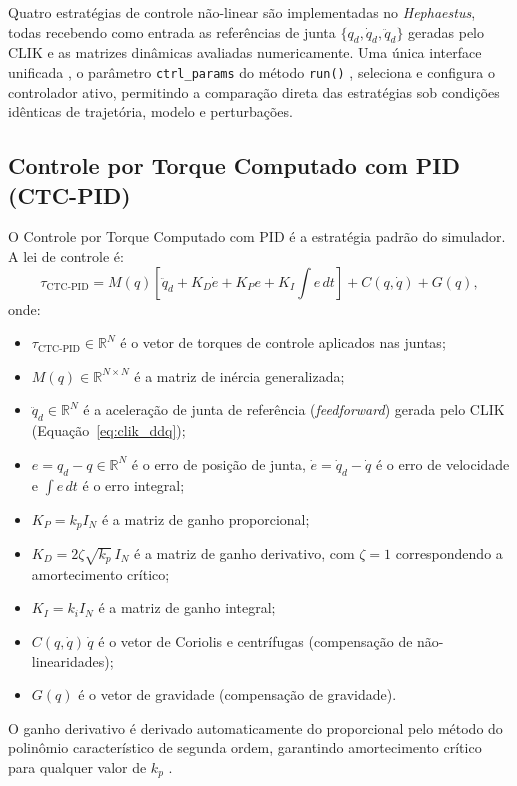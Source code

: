 Quatro estratégias de controle não-linear são implementadas no \textit{Hephaestus}, todas recebendo como entrada as referências de junta $\{q_d, \dot{q}_d, \ddot{q}_d\}$ geradas pelo CLIK e as matrizes dinâmicas avaliadas numericamente. Uma única interface unificada , o parâmetro \texttt{ctrl\_params} do método \texttt{run()} , seleciona e configura o controlador ativo, permitindo a comparação direta das estratégias sob condições idênticas de trajetória, modelo e perturbações.

\subsection{Controle por Torque Computado com PID (CTC-PID)}

O Controle por Torque Computado com PID \cite{craig1989introduction, spong2020robot} é a estratégia padrão do simulador. A lei de controle é:
\begin{equation}
    \tau_{\text{CTC-PID}} = M(q)\left[\ddot{q}_d + K_D\dot{e} + K_P e + K_I \int e\,dt\right] + C(q,\dot{q}) + G(q),
    \label{eq:ctc_pid_impl}
\end{equation}
onde:
\begin{itemize}
    \item $\tau_{\text{CTC-PID}} \in \mathbb{R}^N$ é o vetor de torques de controle aplicados nas juntas;
    \item $M(q) \in \mathbb{R}^{N \times N}$ é a matriz de inércia generalizada;
    \item $\ddot{q}_d \in \mathbb{R}^N$ é a aceleração de junta de referência (\textit{feedforward}) gerada pelo CLIK (Equação~\eqref{eq:clik_ddq});
    \item $e = q_d - q \in \mathbb{R}^N$ é o erro de posição de junta, $\dot{e} = \dot{q}_d - \dot{q}$ é o erro de velocidade e $\int e\,dt$ é o erro integral;
    \item $K_P = k_p I_N$ é a matriz de ganho proporcional;
    \item $K_D = 2\zeta\sqrt{k_p}\,I_N$ é a matriz de ganho derivativo, com $\zeta = 1$ correspondendo a amortecimento crítico;
    \item $K_I = k_i I_N$ é a matriz de ganho integral;
    \item $C(q,\dot{q})\,\dot{q}$ é o vetor de Coriolis e centrífugas (compensação de não-linearidades);
    \item $G(q)$ é o vetor de gravidade (compensação de gravidade).
\end{itemize}
O ganho derivativo é derivado automaticamente do proporcional pelo método do polinômio característico de segunda ordem, garantindo amortecimento crítico para qualquer valor de $k_p$ \cite{astrom1995theory}.

